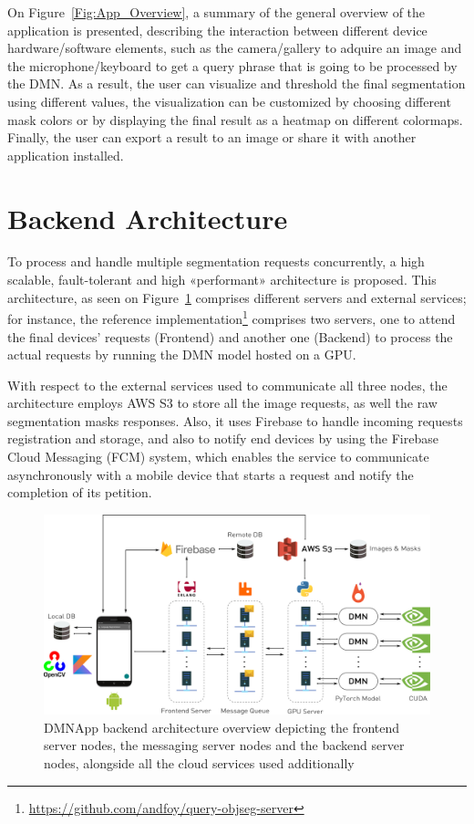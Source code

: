 On Figure~\ref{Fig:App_Overview}, a summary of the general overview of the application is presented, describing the interaction between different device hardware/software elements, such as the camera/gallery to adquire an image and the microphone/keyboard to get a query phrase that is going to be processed by the DMN. As a result, the user can visualize and threshold the final segmentation using different values, the visualization can be customized by choosing different mask colors or by displaying the final result as a heatmap on different colormaps. Finally, the user can export a result to an image or share it with another application installed.

\section{Backend Architecture}
To process and handle multiple segmentation requests concurrently, a high scalable, fault-tolerant and high «performant» architecture is proposed. This architecture, as seen on Figure~\ref{Fig:Backend_Overview} comprises different servers and external services; for instance, the reference implementation\footnote{\url{https://github.com/andfoy/query-objseg-server}} comprises two servers, one to attend the final devices' requests (Frontend) and another one (Backend) to process the actual requests by running the DMN model hosted on a GPU. 

With respect to the external services used to communicate all three nodes, the architecture employs AWS S3 to store all the image requests, as well the raw segmentation masks responses. Also, it uses Firebase to handle incoming requests registration and storage, and also to notify end devices by using the Firebase Cloud Messaging (FCM) system, which enables the service to communicate asynchronously with a mobile device that starts a request and notify the completion of its petition.

\begin{figure}[!htbp]
    \centering
    \includegraphics[width=\textwidth]{./figures/dmn_app/Backend_Overview.pdf}
    \caption{DMNApp backend architecture overview depicting the frontend server nodes, the messaging server nodes and the backend server nodes, alongside all the cloud services used additionally}
    \label{Fig:Backend_Overview}
\end{figure}


